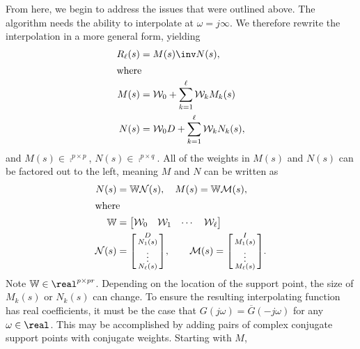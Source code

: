 \documentclass[letterpaper, 10 pt, conference]{ieeeconf}  %
\newcommand{\non}{\nonumber}
\newcommand{\mbb}[1]{\mathbb{#1}}
\newcommand{\mcal}[1]{\mathcal{#1}}
\begin{document}
From here, we begin to address the issues that were outlined above.  The algorithm needs the ability to interpolate at \(\omega=j\infty\).  We therefore rewrite the interpolation in a more general form, yielding
\begin{subequations} \label{rmn_eq}
        \begin{align}
                R_\ell(s) &= M(s)\inv N(s), \\
                \shortintertext{where}
                M(s) &= \mcal{W}_0 + \sum_{k=1}^\ell \mcal{W}_k M_k(s) \\
                N(s) &= \mcal{W}_0 D + \sum_{k=1}^\ell \mcal{W}_k N_k(s), 
        \end{align}
\end{subequations}
and \(M(s)\in\comp^{p\times p}\), \(N(s)\in\comp^{p\times q}\).  All of the weights in \(M(s)\) and \(N(s)\) can be factored out to the left, meaning \(M\) and \(N\) can be written as
\begin{align}
    N(s) &= \mbb{W}\mcal{N}(s), \quad M(s) = \mbb{W}\mcal{M}(s), \non \\
    \shortintertext{where}
    \mbb{W} &= \begin{bmatrix}\mcal{W}_0 & \mcal{W}_1 & \cdots & \mcal{W}_\ell\end{bmatrix} \non \\
    \mcal{N}(s) &= \begin{bsmallmatrix}D \\ N_1(s) \\ \vdots \\ N_\ell(s)\end{bsmallmatrix}, \qquad \mcal{M}(s) = \begin{bsmallmatrix}I \\ M_1(s) \\ \vdots \\ M_\ell(s)\end{bsmallmatrix}. \non 
\end{align}
Note \(\mbb{W}\in\real^{p\times pr}\).  Depending on the location of the support point, the size of \(M_k(s)\) or \(N_k(s)\) can change.  To ensure the resulting interpolating function has real coefficients, it must be the case that \(G(j\omega) = \overline{G}(-j\omega)\) for any \(\omega\in\real\).  This may be accomplished by adding pairs of complex conjugate support points with conjugate weights.  Starting with \(M\),
\end{document}
